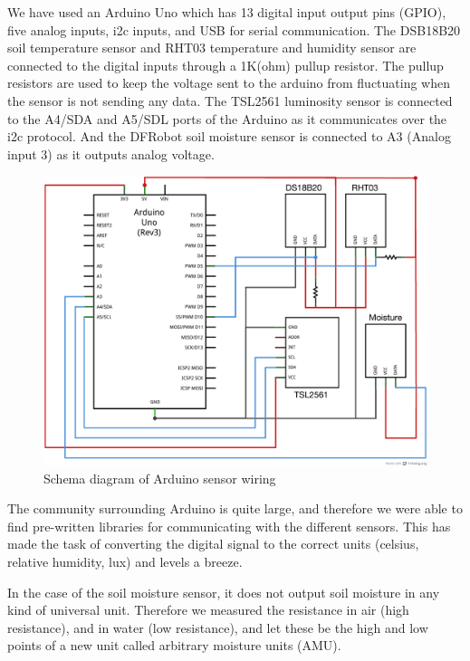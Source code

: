 We have used an Arduino Uno which has 13 digital input output pins (GPIO), five analog inputs, i2c inputs, and USB for serial communication. The DSB18B20 soil temperature sensor and RHT03 temperature and humidity sensor are connected to the digital inputs through a 1K(ohm) pullup resistor. The pullup resistors are used to keep the voltage sent to the arduino from fluctuating when the sensor is not sending any data. The TSL2561 luminosity sensor is connected to the A4/SDA and A5/SDL ports of the Arduino as it communicates over the i2c protocol. And the DFRobot soil moisture sensor is connected to A3 (Analog input 3) as it outputs analog voltage.  

\begin{figure}
\centering
\includegraphics[width=1\textwidth]{img/hardware/Arduino_and_sensors_schem.png}
\caption{Schema diagram of Arduino sensor wiring}
\label{fig:arduino}
\end{figure}

The community surrounding Arduino is quite large, and therefore we were able to find pre-written libraries for communicating with the different sensors. This has made the task of converting the digital signal to the correct units (celsius, relative humidity, lux) and levels a breeze. 

In the case of the soil moisture sensor, it does not output soil moisture in any kind of universal unit. Therefore we measured the resistance in air (high resistance), and in water (low resistance), and let these be the high and low points of a new unit called arbitrary moisture units (AMU).

